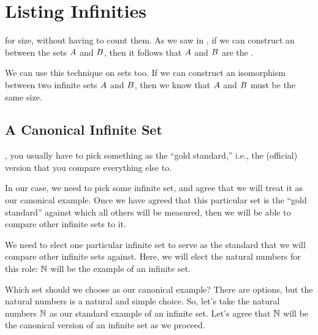 \documentclass[../../../main.tex]{subfiles}
\begin{document}
\chapter{Listing Infinities}
\label{ch:listing-infinities}

 for size, without having to count them. As we saw in , if we can construct an  between the sets $A$ and $B$, then it follows that $A$ and $B$ are the . 

We can use this technique on  sets too. If we can construct an isomorphism between two infinite sets $A$ and $B$, then we know that $A$ and $B$ must be the same size.




\section{A Canonical Infinite Set}

, you usually have to pick something as the ``gold standard,'' i.e., the  (official) version that you compare everything else to.

In our case, we need to pick some infinite set, and agree that we will treat it as our canonical example. Once we have agreed that this particular set is the ``gold standard'' against which all others will be measured, then we will be able to compare other infinite sets to it.

\begin{terminology}
  We need to elect one particular infinite set to serve as the standard that we will compare other infinite sets against. Here, we will elect the natural numbers for this role: $\Nats/$ will be the  example of an infinite set. 
\end{terminology}

Which set should we choose as our canonical example? There are options, but the natural numbers is a natural and simple choice. So, let's take the natural numbers $\Nats/$ as our standard example of an infinite set. Let's agree that $\Nats/$ will be the canonical version of an infinite set as we proceed.
\end{document}
